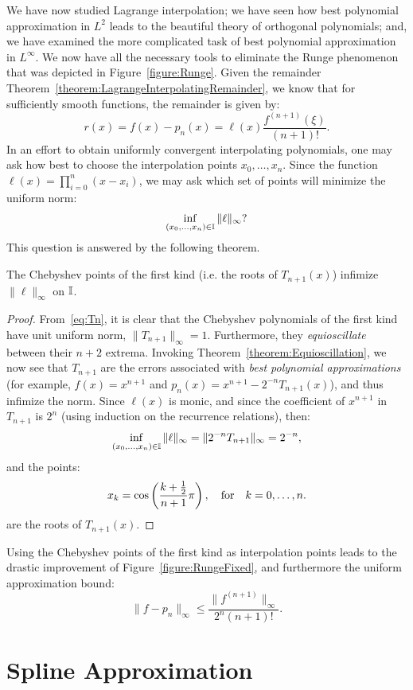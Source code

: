 We have now studied Lagrange interpolation; we have seen how best polynomial approximation in $L^2$ leads to the beautiful theory of orthogonal polynomials; and, we have examined the more complicated task of best polynomial approximation in $L^\infty$. We now have all the necessary tools to eliminate the Runge phenomenon that was depicted in Figure~\ref{figure:Runge}. Given the remainder Theorem~\ref{theorem:LagrangeInterpolatingRemainder}, we know that for sufficiently smooth functions, the remainder is given by:
\[
r(x) = f(x)-p_n(x) = \ell(x)\dfrac{f^{(n+1)}(\xi)}{(n+1)!}.
\]
In an effort to obtain uniformly convergent interpolating polynomials, one may ask how best to choose the interpolation points $x_0,\ldots,x_n$. Since the function $\ell(x) = \prod_{i=0}^n(x-x_i)$, we may ask which set of points will minimize the uniform norm:
\[
\inf_{(x_0,\ldots,x_n)\in\mathbb{I}}\|\ell\|_\infty?
\]
This question is answered by the following theorem.
\begin{theorem}
The Chebyshev points of the first kind (i.e. the roots of $T_{n+1}(x)$) infimize $\|\ell\|_\infty$ on $\mathbb{I}$.
\end{theorem}
\begin{proof}
From~\eqref{eq:Tn}, it is clear that the Chebyshev polynomials of the first kind have unit uniform norm, $\|T_{n+1}\|_\infty = 1$. Furthermore, they {\em equioscillate} between their $n+2$ extrema. Invoking Theorem~\ref{theorem:Equioscillation}, we now see that $T_{n+1}$ are the errors associated with {\em best polynomial approximations} (for example, $f(x) = x^{n+1}$ and $p_n(x) = x^{n+1}-2^{-n}T_{n+1}(x)$), and thus infimize the norm. Since $\ell(x)$ is monic, and since the coefficient of $x^{n+1}$ in $T_{n+1}$ is $2^n$ (using induction on the recurrence relations), then:
\[
\inf_{(x_0,\ldots,x_n)\in\mathbb{I}}\|\ell\|_\infty = \|2^{-n}T_{n+1}\|_\infty = 2^{-n},
\]
and the points:
\[
x_k = \cos\left(\dfrac{k+\frac{1}{2}}{n+1}\pi\right),\quad{\rm for}\quad k=0,\ldots,n.
\]
are the roots of $T_{n+1}(x)$.
\end{proof}
Using the Chebyshev points of the first kind as interpolation points leads to the drastic improvement of Figure~\ref{figure:RungeFixed}, and furthermore the uniform approximation bound:
\[
\|f-p_n\|_\infty \le \dfrac{\|f^{(n+1)}\|_\infty}{2^{n}(n+1)!}.
\]

\section{Spline Approximation}

